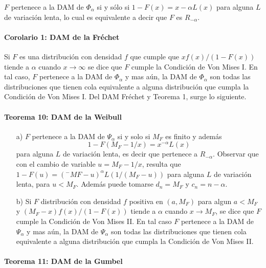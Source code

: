 \documentclass[
]{book}
\theoremstyle{definition}
\theoremstyle{definition}
\theoremstyle{definition}
\theoremstyle{definition}
\theoremstyle{remark}
\begin{document}
\(F\) pertenece a la DAM de \(\Phi_{\alpha}\) si y sólo si
\(1-F(x)=x-\alpha L(x)\) para alguna \(L\) de variación lenta,
lo cual es equivalente a decir que \(F\) es \(R_{-\alpha}\).

\paragraph{Corolario 1: DAM de la Fréchet}\label{corolario-1-dam-de-la-fruxe9chet}

Si \(F\) es una distribución con densidad \(f\) que cumple que \(xf(x)/(1-F(x))\) tiende a \(\alpha\) cuando \(x \rightarrow  \infty\)
se dice que \(F\) cumple la Condición de Von Mises I. En tal caso, \(F\) pertenece a la DAM de \(\Phi_{\alpha}\) y mas aún, la DAM de \(\Phi_{\alpha}\) son todas las distribuciones que tienen cola equivalente a alguna distribución que cumpla la Condición de Von Mises I.
Del DAM Fréchet y Teorema 1, surge lo siguiente.

\paragraph{Teorema 10: DAM de la Weibull}\label{teorema-10-dam-de-la-weibull}

\begin{itemize}
\item [a)] $F$ pertenece a la DAM de $\Psi_{\alpha}$ si y solo si $M_F$ es finito y además $$1-F(M_F -1/x)=x^{-\alpha} L(x)$$ para alguna
$L$ de variación lenta, es decir que pertenece a $R_{-\alpha}$. Observar que con el cambio de variable $u=M_F -1/x$,
resulta que $1-F(u)=(^{-}MF -u)^{\alpha} L(1/(M_F -u))$ para alguna $L$ de variación lenta, para $u< M_F$. Además puede tomarse $d_n= M_F$ y $c_n= n-\alpha$.
\item [b)] Si $F$ distribución con densidad $f$ positiva en $(a,M_F)$ para algun $a< M_F$ y $(M_F -x)f(x)/(1-F(x))$ tiende a $\alpha$ cuando $x\rightarrow M_F$, se dice que $F$ cumple la Condición de Von Mises II. En tal caso $F$ pertenece a la DAM de $\Psi_{\alpha}$ y mas aún, la DAM de $\Psi_{\alpha}$ son todas las distribuciones que tienen cola equivalente a alguna distribución que cumpla la Condición de Von Mises II.
\end{itemize}

\paragraph{Teorema 11: DAM de la Gumbel}\label{teorema-11-dam-de-la-gumbel}
\end{document}

